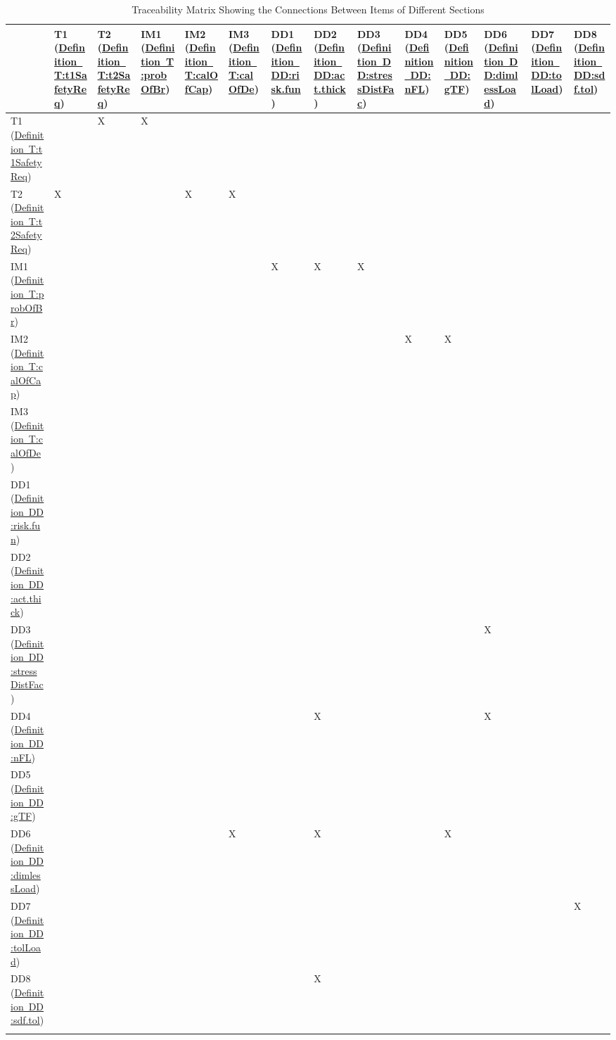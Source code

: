 \documentclass[12pt]{article}
\begin{document}
\begin{longtable}{l l l l l l l l l l l l l l}
\toprule
 & T1 (\hyperref[T:t1SafetyReq]{Definition~T:t1SafetyReq}) & T2 (\hyperref[T:t2SafetyReq]{Definition~T:t2SafetyReq}) & IM1 (\hyperref[T:probOfBr]{Definition~T:probOfBr}) & IM2 (\hyperref[T:calOfCap]{Definition~T:calOfCap}) & IM3 (\hyperref[T:calOfDe]{Definition~T:calOfDe}) & DD1 (\hyperref[DD:risk.fun]{Definition~DD:risk.fun}) & DD2 (\hyperref[DD:act.thick]{Definition~DD:act.thick}) & DD3 (\hyperref[DD:stressDistFac]{Definition~DD:stressDistFac}) & DD4 (\hyperref[DD:nFL]{Definition~DD:nFL}) & DD5 (\hyperref[DD:gTF]{Definition~DD:gTF}) & DD6 (\hyperref[DD:dimlessLoad]{Definition~DD:dimlessLoad}) & DD7 (\hyperref[DD:tolLoad]{Definition~DD:tolLoad}) & DD8 (\hyperref[DD:sdf.tol]{Definition~DD:sdf.tol})
\\
\midrule
T1 (\hyperref[T:t1SafetyReq]{Definition~T:t1SafetyReq}) &  & X & X &  &  &  &  &  &  &  &  &  & 
\\
T2 (\hyperref[T:t2SafetyReq]{Definition~T:t2SafetyReq}) & X &  &  & X & X &  &  &  &  &  &  &  & 
\\
IM1 (\hyperref[T:probOfBr]{Definition~T:probOfBr}) &  &  &  &  &  & X & X & X &  &  &  &  & 
\\
IM2 (\hyperref[T:calOfCap]{Definition~T:calOfCap}) &  &  &  &  &  &  &  &  & X & X &  &  & 
\\
IM3 (\hyperref[T:calOfDe]{Definition~T:calOfDe}) &  &  &  &  &  &  &  &  &  &  &  &  & 
\\
DD1 (\hyperref[DD:risk.fun]{Definition~DD:risk.fun}) &  &  &  &  &  &  &  &  &  &  &  &  & 
\\
DD2 (\hyperref[DD:act.thick]{Definition~DD:act.thick}) &  &  &  &  &  &  &  &  &  &  &  &  & 
\\
DD3 (\hyperref[DD:stressDistFac]{Definition~DD:stressDistFac}) &  &  &  &  &  &  &  &  &  &  & X &  & 
\\
DD4 (\hyperref[DD:nFL]{Definition~DD:nFL}) &  &  &  &  &  &  & X &  &  &  & X &  & 
\\
DD5 (\hyperref[DD:gTF]{Definition~DD:gTF}) &  &  &  &  &  &  &  &  &  &  &  &  & 
\\
DD6 (\hyperref[DD:dimlessLoad]{Definition~DD:dimlessLoad}) &  &  &  &  & X &  & X &  &  & X &  &  & 
\\
DD7 (\hyperref[DD:tolLoad]{Definition~DD:tolLoad}) &  &  &  &  &  &  &  &  &  &  &  &  & X
\\
DD8 (\hyperref[DD:sdf.tol]{Definition~DD:sdf.tol}) &  &  &  &  &  &  & X &  &  &  &  &  & 
\\
\bottomrule
\caption{Traceability Matrix Showing the Connections Between Items of Different Sections}
\label{Table:TraceyItemSecs}
\end{longtable}
\end{document}
